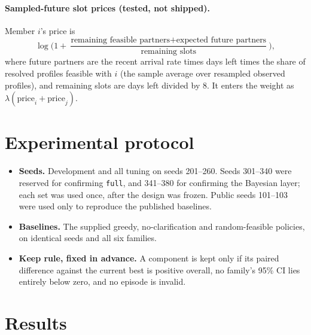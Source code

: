 \documentclass[10pt]{article}
\newcommand{\full}{\texttt{full}}
\begin{document}
\paragraph{Sampled-future slot prices (tested, not shipped).} Member $i$'s price is
\[
\log\!\Big(1+\frac{\text{remaining feasible partners}+\text{expected future partners}}{\text{remaining slots}}\Big),
\]
where future partners are the recent arrival rate times days left times the share of resolved profiles feasible with $i$ (the sample average over resampled observed profiles), and remaining slots are days left divided by 8. It enters the weight as $\lambda(\text{price}_i+\text{price}_j)$.

\section{Experimental protocol}\label{sec:protocol}

\begin{itemize}
\item \textbf{Seeds.} Development and all tuning on seeds 201--260. Seeds 301--340 were reserved for confirming \full{}, and 341--380 for confirming the Bayesian layer; each set was used once, after the design was frozen. Public seeds 101--103 were used only to reproduce the published baselines.
\item \textbf{Baselines.} The supplied greedy, no-clarification and random-feasible policies, on identical seeds and all six families.
\item \textbf{Keep rule, fixed in advance.} A component is kept only if its paired difference against the current best is positive overall, no family's 95\% CI lies entirely below zero, and no episode is invalid.
\end{itemize}

\section{Results}\label{sec:results}
\end{document}
